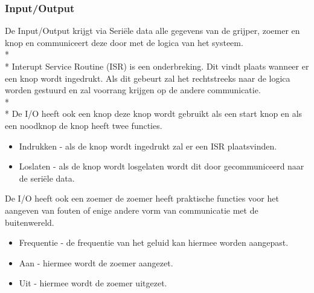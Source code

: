 \documentclass[12pt]{article} %
\begin{document}
\subsubsection{Input/Output}
De Input/Output krijgt via Seriële data alle gegevens van de grijper, zoemer en knop en communiceert deze door met de logica van het systeem. \\* \\*
Interupt Service Routine (ISR) is een onderbreking. Dit vindt plaats wanneer er een knop wordt ingedrukt. Als dit gebeurt zal het rechtstreeks naar de logica worden gestuurd en zal voorrang krijgen op de andere communicatie. \\* \\*
De I/O heeft ook een knop deze knop wordt gebruikt als een start knop en als een noodknop de knop heeft twee functies.
\begin{itemize}
\item Indrukken - als de knop wordt ingedrukt zal er een ISR plaatsvinden.
\item Loslaten - als de knop wordt losgelaten wordt dit door gecommuniceerd naar de seriële data.
\end{itemize}
De I/O heeft ook een zoemer de zoemer heeft praktische functies voor het aangeven van fouten of enige andere vorm van communicatie met de buitenwereld.
\begin{itemize}
\item Frequentie - de frequentie van het geluid kan hiermee worden aangepast.
\item Aan - hiermee wordt de zoemer aangezet.
\item Uit - hiermee wordt de zoemer uitgezet.
\end{itemize}
\end{document}
